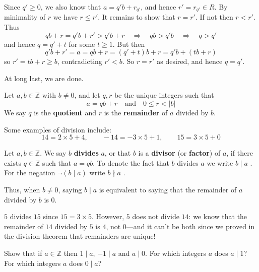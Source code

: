 \begin{cproof}
\begin{itemize}
Since $q' \ge 0$, we also know that $a=q'b+r_{q'}$, and hence $r' = r_{q'} \in R$. By minimality of $r$ we have $r \le r'$. It remains to show that $r = r'$. If not then $r<r'$. Thus
\[ qb+r = q'b+r' > q'b+r \quad \Rightarrow \quad qb > q'b \quad \Rightarrow \quad q > q' \]
and hence $q = q'+t$ for some $t \ge 1$. But then
\[ q'b+r' = a = qb+r = (q'+t)b+r = q'b+(tb+r) \]
so $r' = tb + r \ge b$, contradicting $r'<b$. So $r=r'$ as desired, and hence $q=q'$.
\end{itemize}

At long last, we are done.
\end{cproof}

\begin{definition}
\label{defQuotientRemainder}
Let $a,b \in \mathbb{Z}$ with $b \ne 0$, and let $q,r$ be the unique integers such that
\[ a = qb+r \quad \text{and} \quad 0 \le r < |b| \]
We say $q$ is the \textbf{quotient} and $r$ is the \textbf{remainder} of $a$ divided by $b$.
\end{definition}

\begin{example}
Some examples of division include:
\[ 14 = 2 \times 5 + 4, \qquad -14 = -3 \times 5 + 1, \qquad 15 = 3 \times 5 + 0 \]
\end{example}

\begin{definition}
\label{defDivision}
Let $a,b \in \mathbb{Z}$. We say $b$ \textbf{divides} $a$, or that $b$ is a \textbf{divisor} (or \textbf{factor}) of $a$, if there exists $q \in \mathbb{Z}$ such that $a=qb$. To denote the fact that $b$ divides $a$ we write $b \mid a$ . For the negation $\neg (b \mid a)$ write $b \nmid a$ .
\end{definition}

Thus, when $b \ne 0$, saying $b \mid a$ is equivalent to saying that the remainder of $a$ divided by $b$ is $0$.

\begin{example}
$5$ divides $15$ since $15 = 3 \times 5$. However, $5$ does not divide $14$: we know that the remainder of $14$ divided by $5$ is $4$, not $0$---and it can't be both since we proved in the division theorem that remainders are unique!
\end{example}

\begin{exercise}
\label{exOneDivDivZero}
Show that if $a \in \mathbb{Z}$ then $1 \mid a$, $-1 \mid a$ and $a \mid 0$. For which integers $a$ does $a \mid 1$? For which integers $a$ does $0 \mid a$?
\end{exercise}


